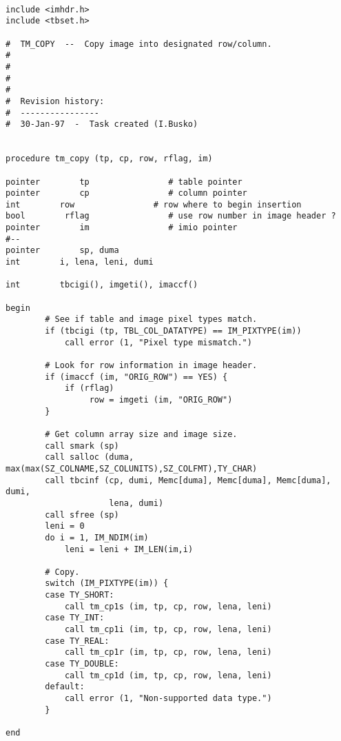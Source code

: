 \begin{verbatim}

include <imhdr.h>
include <tbset.h>

#  TM_COPY  --  Copy image into designated row/column.
#
#
#
#
#  Revision history:
#  ----------------
#  30-Jan-97  -  Task created (I.Busko)


procedure tm_copy (tp, cp, row, rflag, im)

pointer        tp                # table pointer
pointer        cp                # column pointer
int        row                # row where to begin insertion
bool        rflag                # use row number in image header ?
pointer        im                # imio pointer
#--
pointer        sp, duma
int        i, lena, leni, dumi

int        tbcigi(), imgeti(), imaccf()

begin
        # See if table and image pixel types match.
        if (tbcigi (tp, TBL_COL_DATATYPE) == IM_PIXTYPE(im))
            call error (1, "Pixel type mismatch.")

        # Look for row information in image header.
        if (imaccf (im, "ORIG_ROW") == YES) {
            if (rflag)
                 row = imgeti (im, "ORIG_ROW")   
        }

        # Get column array size and image size. 
        call smark (sp)
        call salloc (duma, max(max(SZ_COLNAME,SZ_COLUNITS),SZ_COLFMT),TY_CHAR)
        call tbcinf (cp, dumi, Memc[duma], Memc[duma], Memc[duma], dumi, 
                     lena, dumi)
        call sfree (sp)
        leni = 0
        do i = 1, IM_NDIM(im)
            leni = leni + IM_LEN(im,i)

        # Copy.
        switch (IM_PIXTYPE(im)) {
        case TY_SHORT:
            call tm_cp1s (im, tp, cp, row, lena, leni)
        case TY_INT:
            call tm_cp1i (im, tp, cp, row, lena, leni)
        case TY_REAL:
            call tm_cp1r (im, tp, cp, row, lena, leni)
        case TY_DOUBLE:
            call tm_cp1d (im, tp, cp, row, lena, leni)
        default:
            call error (1, "Non-supported data type.")
        }

end




\end{verbatim}
\newpage
{}
